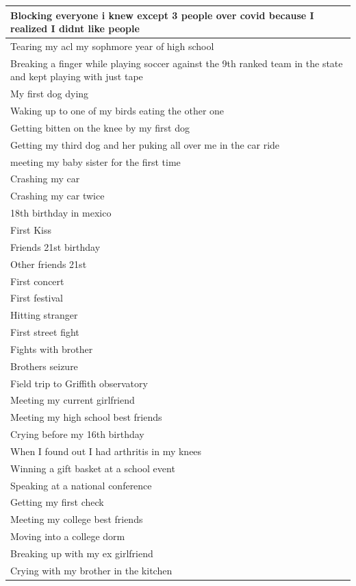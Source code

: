 \documentclass[
  .7em,
  letterpaper,
  DIV=11,
  numbers=noendperiod]{scrartcl}
\begin{document}
\begin{table}
\begin{tabular}{l}
\hline
Blocking everyone i knew except 3 people over covid because I realized I didnt like people\\
\hline
Tearing my acl my sophmore year of high school\\
\hline
Breaking a finger while playing soccer against the 9th ranked team in the state and kept playing with just tape\\
\hline
My first dog dying\\
\hline
Waking up to one of my birds eating the other one\\
\hline
Getting bitten on the knee by my first dog\\
\hline
Getting my third dog and her puking all over me in the car ride\\
\hline
meeting my baby sister for the first time\\
\hline
Crashing my car\\
\hline
Crashing my car twice\\
\hline
18th birthday in mexico\\
\hline
First Kiss\\
\hline
Friends 21st birthday\\
\hline
Other friends 21st\\
\hline
First concert\\
\hline
First festival\\
\hline
Hitting stranger\\
\hline
First street fight\\
\hline
Fights with brother\\
\hline
Brothers seizure\\
\hline
Field trip to Griffith observatory\\
\hline
Meeting my current girlfriend\\
\hline
Meeting my high school best friends\\
\hline
Crying before my 16th birthday\\
\hline
When I found out I had arthritis in my knees\\
\hline
Winning a gift basket at a school event\\
\hline
Speaking at a national conference\\
\hline
Getting my first check\\
\hline
Meeting my college best friends\\
\hline
Moving into a college dorm\\
\hline
Breaking up with my ex girlfriend\\
\hline
Crying with my brother in the kitchen\\

\end{tabular}
\end{table}
\end{document}
